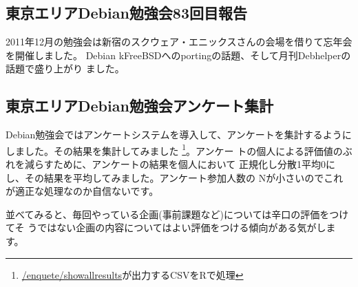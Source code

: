 \documentclass[mingoth,a4paper]{jsarticle}
\begin{document}
\begin{multicols}{2}
 
 \subsection{東京エリアDebian勉強会83回目報告}

2011年12月の勉強会は新宿のスクウェア・エニックスさんの会場を借りて忘年会を開催しました。
Debian kFreeBSDへのportingの話題、そして月刊Debhelperの話題で盛り上がり
ました。

 \subsection{東京エリアDebian勉強会アンケート集計}

 Debian勉強会ではアンケートシステムを導入して、アンケートを集計するように
 しました。その結果を集計してみました
 \footnote{\url{/enquete/showallresults}が出力するCSVをRで処理}。アンケー
 トの個人による評価値のぶれを減らすために、アンケートの結果を個人において
 正規化し分散1平均0にし、その結果を平均してみました。アンケート参加人数の
 Nが小さいのでこれが適正な処理なのか自信ないです。

 並べてみると、毎回やっている企画(事前課題など)については辛口の評価をつけてそ
 うではない企画の内容についてはよい評価をつける傾向がある気がします。


\end{multicols}
\end{document}
